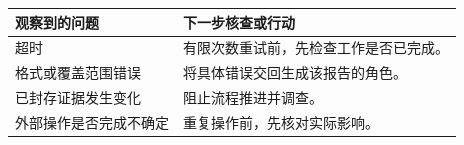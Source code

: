 \begin{tabular}{@{}P{4.0cm}P{8.5cm}@{}}
\toprule
\textbf{观察到的问题} & \textbf{下一步核查或行动} \\
\midrule
超时 & 有限次数重试前，先检查工作是否已完成。 \\
格式或覆盖范围错误 & 将具体错误交回生成该报告的角色。 \\
已封存证据发生变化 & 阻止流程推进并调查。 \\
外部操作是否完成不确定 & 重复操作前，先核对实际影响。 \\
\bottomrule
\end{tabular}

